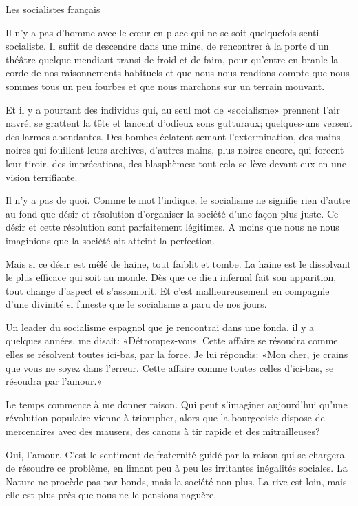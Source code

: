 \begin{chapter}{Les socialistes français}

Il n'y a pas d'homme avec le cœur en place qui ne se soit quelquefois
senti socialiste. Il suffit de descendre dans une mine, de rencontrer à
la porte d'un théâtre quelque mendiant transi de froid et de faim, pour
qu'entre en branle la corde de nos raisonnements habituels et que nous
nous rendions compte que nous sommes tous un peu fourbes et que nous
marchons sur un terrain mouvant.

Et il y a pourtant des individus qui, au seul mot de «socialisme»
prennent l'air navré, se grattent la tête et lancent d'odieux sons
gutturaux; quelques-uns versent des larmes abondantes. Des bombes
éclatent semant l'extermination, des mains noires qui fouillent leurs
archives, d'autres mains, plus noires encore, qui forcent leur tiroir,
des imprécations, des blasphèmes: tout cela se lève devant eux en une
vision terrifiante.

Il n'y a pas de quoi. Comme le mot l'indique, le socialisme ne signifie
rien d'autre au fond que désir et résolution d'organiser la société
d'une façon plus juste. Ce désir et cette résolution sont parfaitement
légitimes. A moins que nous ne nous imaginions que la société ait
atteint la perfection.

Mais si ce désir est mêlé de haine, tout faiblit et tombe. La haine est
le dissolvant le plus efficace qui soit au monde. Dès que ce dieu
infernal fait son apparition, tout change d'aspect et s'assombrit. Et
c'est malheureusement en compagnie d'une divinité si funeste que le
socialisme a paru de nos jours.

Un leader du socialisme espagnol que je rencontrai dans une fonda,
il y a quelques années, me disait: «Détrompez-vous. Cette affaire se
résoudra comme elles se résolvent toutes ici-bas, par la force. Je lui
répondis: «Mon cher, je crains que vous ne soyez dans l'erreur. Cette
affaire comme toutes celles d'ici-bas, se résoudra par l'amour.»

Le temps commence à me donner raison. Qui peut s'imaginer aujourd'hui
qu'une révolution populaire vienne à triompher, alors que la bourgeoisie
dispose de mercenaires avec des mausers, des canons à tir rapide et des
mitrailleuses?

Oui, l'amour. C'est le sentiment de fraternité guidé par la raison qui
se chargera de résoudre ce problème, en limant peu à peu les irritantes
inégalités sociales. La Nature ne procède pas par bonds, mais la société
non plus. La rive est loin, mais elle est plus près que nous ne le
pensions naguère.


\end{chapter}
